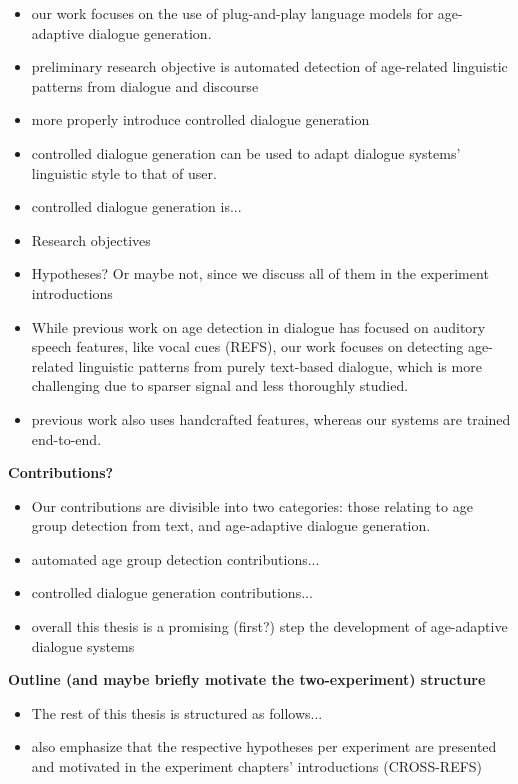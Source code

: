 \begin{itemize}
    \item our work focuses on the use of plug-and-play language models for age-adaptive dialogue generation.
    \item preliminary research objective is automated detection of age-related linguistic patterns from dialogue and discourse
    \item more properly introduce controlled dialogue generation
    \item controlled dialogue generation can be used to adapt dialogue systems' linguistic style to that of user.
    \item controlled dialogue generation is...
    \item Research objectives
    \item Hypotheses? Or maybe not, since we discuss all of them in the experiment introductions
    \item While previous work on age detection in dialogue has focused on auditory speech features, like vocal cues (REFS), our work focuses on detecting age-related linguistic patterns from purely text-based dialogue, which is more challenging due to sparser signal and less thoroughly studied.
    \item previous work also uses handcrafted features, whereas our systems are trained end-to-end.
\end{itemize}

\textbf{Contributions?}
\begin{itemize}
    \item Our contributions are divisible into two categories: those relating to age group detection from text, and age-adaptive dialogue generation.
    \item automated age group detection contributions...
    \item controlled dialogue generation contributions...
    \item overall this thesis is a promising (first?) step the development of age-adaptive dialogue systems
\end{itemize}

\textbf{Outline (and maybe briefly motivate the two-experiment) structure}
\begin{itemize}
    \item The rest of this thesis is structured as follows...
    \item also emphasize that the respective hypotheses per experiment are presented and motivated in the experiment chapters' introductions (CROSS-REFS)
\end{itemize}


